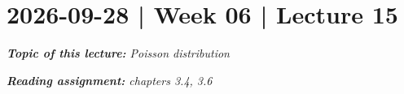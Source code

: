 \documentclass[10pt]{article}
\theoremstyle{definition}
\newtheorem{example}[theorem]{Example}
\renewenvironment{example}
{\begin{oldexample}}
  {\par\smallskip\hfill   End of Example~\theexample. $\square$    \par\end{oldexample}}
\newcommand{\1}[1]{\textbf{1}_{\left[#1\right]}} %
\def\E{\mathbb{E}} %
\def\Var{\mathrm{Var}} %
\begin{document}
\newpage

\section{2026-09-28 | Week 06 | Lecture 15}
\begin{center}
  \begin{tcolorbox}[width=0.9\textwidth, colback=white, colframe=black]
    \textit{\textbf{Topic of this lecture:} Poisson distribution}

    \textit{\textbf{Reading assignment:} chapters 3.4, 3.6}
  \end{tcolorbox}
\end{center}




\end{document}
